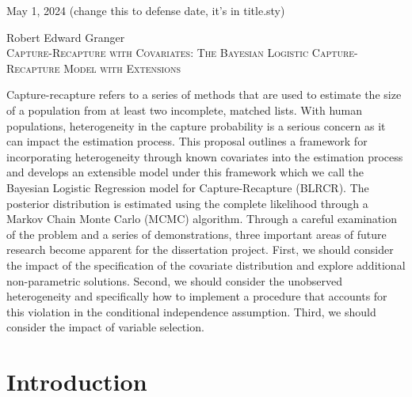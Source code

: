 \documentclass[
  12pt,
]{article}
\begin{document}
\vspace*{20\baselineskip}

\raggedright

May 1, 2024 (change this to defense date, it's in title.sty)

\newpage
\doublespacing
\begin{center}
Robert Edward Granger\\
\textsc{Capture-Recapture with Covariates: The Bayesian Logistic Capture-Recapture Model with Extensions}\\
\end{center}

\normalsize

Capture-recapture refers to a series of methods that are used to estimate the size of a population from at least two incomplete, matched lists.  With human populations, heterogeneity in the capture probability is a serious concern as it can impact the estimation process. This proposal outlines a framework for incorporating heterogeneity through known covariates into the estimation process and develops an extensible model under this framework which we call the Bayesian Logistic Regression model for Capture-Recapture (BLRCR). The posterior distribution is estimated using the complete likelihood through a Markov Chain Monte Carlo (MCMC) algorithm.  Through a careful examination of the problem and a series of demonstrations, three important areas of future research become apparent for the dissertation project. First, we should consider the impact of the specification of the covariate distribution and explore additional non-parametric solutions.  Second, we should consider the unobserved heterogeneity and specifically how to implement a procedure that accounts for this violation in the conditional independence assumption.  Third, we should consider the impact of variable selection.

\newpage
\tableofcontents
\newpage

\hypersetup{linkcolor = blue}


\newpage
\section{Introduction}
\label{sec:Introduction}
\end{document}
